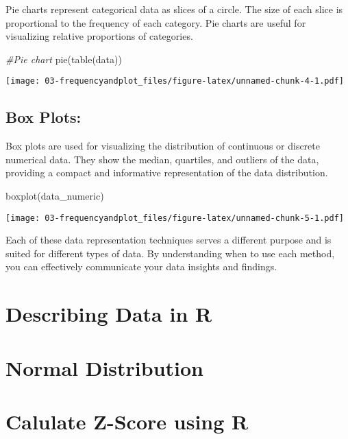\documentclass[
]{book}
\newenvironment{Shaded}{\begin{snugshade}}{\end{snugshade}}
\newcommand{\CommentTok}[1]{\textcolor[rgb]{0.56,0.35,0.01}{\textit{#1}}}
\newcommand{\FunctionTok}[1]{\textcolor[rgb]{0.00,0.00,0.00}{#1}}
\newcommand{\NormalTok}[1]{#1}
\begin{document}
Pie charts represent categorical data as slices of a circle. The size of each slice is proportional to the frequency of each category. Pie charts are useful for visualizing relative proportions of categories.

\begin{Shaded}
\begin{Highlighting}[]
\CommentTok{\#Pie chart}
\FunctionTok{pie}\NormalTok{(}\FunctionTok{table}\NormalTok{(data))}
\end{Highlighting}
\end{Shaded}

\texttt{[image: 03-frequencyandplot\_files/figure-latex/unnamed-chunk-4-1.pdf]}

\hypertarget{box-plots}{%
\section{Box Plots:}\label{box-plots}}

Box plots are used for visualizing the distribution of continuous or discrete numerical data. They show the median, quartiles, and outliers of the data, providing a compact and informative representation of the data distribution.

\begin{Shaded}
\begin{Highlighting}[]
\FunctionTok{boxplot}\NormalTok{(data\_numeric)}
\end{Highlighting}
\end{Shaded}

\texttt{[image: 03-frequencyandplot\_files/figure-latex/unnamed-chunk-5-1.pdf]}

Each of these data representation techniques serves a different purpose and is suited for different types of data. By understanding when to use each method, you can effectively communicate your data insights and findings.

\hypertarget{describing-data-in-r}{%
\chapter{Describing Data in R}\label{describing-data-in-r}}

\hypertarget{normal-distribution}{%
\chapter{Normal Distribution}\label{normal-distribution}}

\hypertarget{calulate-z-score-using-r}{%
\chapter{Calulate Z-Score using R}\label{calulate-z-score-using-r}}
\end{document}
